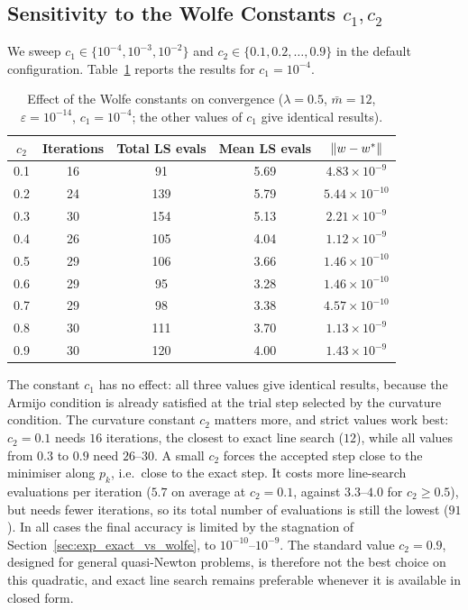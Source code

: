 \subsection{Sensitivity to the Wolfe Constants $c_1, c_2$}
\label{sec:exp_wolfe_constants}

\noindent We sweep $c_1 \in \{10^{-4}, 10^{-3}, 10^{-2}\}$ and
$c_2 \in \{0.1, 0.2, \ldots, 0.9\}$ in the default configuration.
Table~\ref{tab:wolfe_sweep} reports the results for $c_1 = 10^{-4}$.

\begin{table}[H]
\centering
\caption{Effect of the Wolfe constants on convergence
  ($\lambda = 0.5$, $\bar{m} = 12$, $\varepsilon = 10^{-14}$,
  $c_1 = 10^{-4}$; the other values of $c_1$ give identical results).}
\label{tab:wolfe_sweep}
\small
\setlength{\tabcolsep}{10pt}
\begin{tabular}{ccccc}
    \toprule
    $c_2$ & \textbf{Iterations} & \textbf{Total LS evals}
      & \textbf{Mean LS evals} & $\left\|w - w^*\right\|$ \\
    \midrule
    0.1 & 16 & 91  & 5.69 & $4.83 \times 10^{-9}$  \\
    0.2 & 24 & 139 & 5.79 & $5.44 \times 10^{-10}$ \\
    0.3 & 30 & 154 & 5.13 & $2.21 \times 10^{-9}$  \\
    0.4 & 26 & 105 & 4.04 & $1.12 \times 10^{-9}$  \\
    0.5 & 29 & 106 & 3.66 & $1.46 \times 10^{-10}$ \\
    0.6 & 29 & 95  & 3.28 & $1.46 \times 10^{-10}$ \\
    0.7 & 29 & 98  & 3.38 & $4.57 \times 10^{-10}$ \\
    0.8 & 30 & 111 & 3.70 & $1.13 \times 10^{-9}$  \\
    0.9 & 30 & 120 & 4.00 & $1.43 \times 10^{-9}$  \\
    \bottomrule
\end{tabular}
\end{table}

\noindent The constant $c_1$ has no effect: all three values give identical
results, because the Armijo condition is already satisfied at the trial step
selected by the curvature condition. The curvature constant $c_2$ matters
more, and strict values work best: $c_2 = 0.1$ needs $16$ iterations, the
closest to exact line search ($12$), while all values from $0.3$ to $0.9$
need $26$--$30$. A small $c_2$ forces the accepted step close to the
minimiser along $p_k$, i.e.\ close to the exact step. It costs more
line-search evaluations per iteration ($5.7$ on average at $c_2 = 0.1$,
against $3.3$--$4.0$ for $c_2 \geq 0.5$), but needs fewer iterations, so its
total number of evaluations is still the lowest ($91$). In all cases the
final accuracy is limited by the stagnation of
Section~\ref{sec:exp_exact_vs_wolfe}, to $10^{-10}$--$10^{-9}$. The standard
value $c_2 = 0.9$, designed for general quasi-Newton problems, is therefore
not the best choice on this quadratic, and exact line search remains
preferable whenever it is available in closed form.


